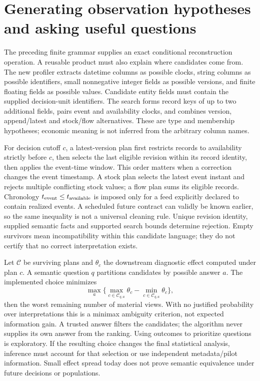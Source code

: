 \section{Generating observation hypotheses and asking useful questions}
\label{s5:observation-generation}
The preceding finite grammar supplies an exact conditional reconstruction
operation. A reusable product must also explain where candidates come from.
The new profiler extracts datetime columns as possible clocks, string
columns as possible identifiers, small nonnegative integer fields as possible
versions, and finite floating fields as possible values. Candidate entity
fields must contain the supplied decision-unit identifiers. The search forms
record keys of up to two additional fields, pairs event and availability
clocks, and combines version, append/latest and stock/flow alternatives.
These are type and membership hypotheses; economic meaning is not inferred
from the arbitrary column names.

For decision cutoff $c$, a latest-version plan first restricts records to
availability strictly before $c$, then selects the last eligible revision
within its record identity, then applies the event-time window. This order
matters when a correction changes the event timestamp. A stock plan selects
the latest event instant and rejects multiple conflicting stock values;
a flow plan sums its eligible records. Chronology
$t_{\rm event}\le t_{\rm available}$ is imposed only for a feed explicitly
declared to contain realized events. A scheduled future contract can validly
be known earlier, so the same inequality is not a universal cleaning rule.
Unique revision identity, supplied semantic facts and supported search bounds
determine rejection. Empty survivors mean incompatibility within this
candidate language; they do not certify that no correct interpretation exists.

Let $\mathcal C$ be surviving plans and $\theta_c$ the downstream diagnostic
effect computed under plan $c$. A semantic question $q$ partitions candidates
by possible answer $a$. The implemented choice minimizes
\[
 \max_a\{\max_{c\in\mathcal C_{q,a}}\theta_c-
                 \min_{c\in\mathcal C_{q,a}}\theta_c\},
\]
then the worst remaining number of material views. With no justified
probability over interpretations this is a minimax ambiguity criterion,
not expected information gain. A trusted answer filters the candidates;
the algorithm never supplies its own answer from the ranking. Using outcomes
to prioritize questions is exploratory. If the resulting choice changes
the final statistical analysis, inference must account for that selection
or use independent metadata/pilot information. Small effect spread today
does not prove semantic equivalence under future decisions or populations.

